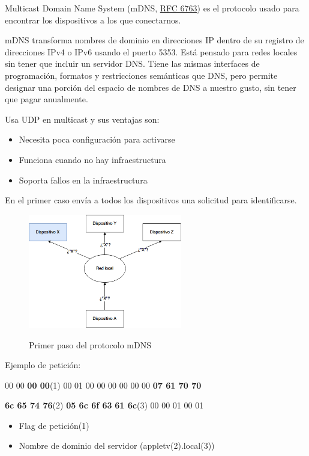 Multicast Domain Name System (mDNS, \href{https://tools.ietf.org/html/rfc6763}{RFC 6763}) es el protocolo usado para encontrar los dispositivos a los que conectarnos.

mDNS transforma nombres de dominio en direcciones IP dentro de su registro de direcciones IPv4 o IPv6 usando el puerto 5353. Está pensado para redes locales sin tener que incluir un servidor DNS.
Tiene las mismas interfaces de programación, formatos y restricciones semánticas que DNS, pero permite designar una porción del espacio de nombres de DNS a nuestro gusto, sin tener que pagar anualmente.

Usa UDP en multicast y sus ventajas son:
\begin{itemize}
	\item Necesita poca configuración para activarse
	\item Funciona cuando no hay infraestructura
	\item Soporta fallos en la infraestructura
\end{itemize}

En el primer caso envía a todos los dispositivos una solicitud para identificarse.

\begin{figure}[H]
	\centering
	\includegraphics[width=0.6\textwidth]{./Imagenes/mdns1.png}
	\label{fig:mdns1}
	\caption{Primer paso del protocolo mDNS}
\end{figure}


Ejemplo de petición:

00 00 \textbf{00 00}(1) 00 01 00 00 \hspace{0.1cm} 00 00 00 00  \textbf{07 61 70 70}

\textbf{6c 65 74 76}(2) \textbf{05 6c 6f 63} \hspace{0.1cm} \textbf{61 6c}(3) 00 00 01 00 01
			
\begin{itemize}
	\item Flag de petición(1)
	\item Nombre de dominio del servidor (appletv(2).local(3))
\end{itemize}


